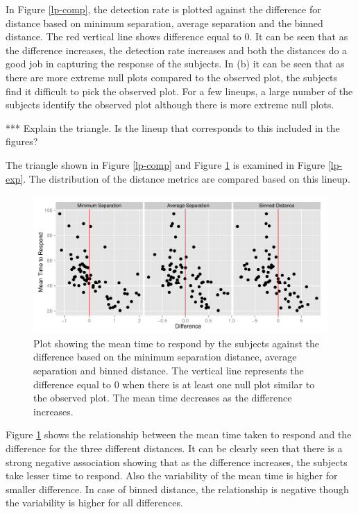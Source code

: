 \documentclass[12]{article}
\newcommand{\red}[1]{{\color{red} #1}}
\begin{document}
In Figure \ref{lp-comp}, the detection rate is plotted against the difference for distance based on minimum separation, average separation and the binned distance. The red vertical line shows difference equal to 0.  It can be seen that as the difference increases, the detection rate increases and both the distances do a good job in capturing the response of the subjects.  In (b) it can be seen that as there are more extreme null plots compared to the observed plot, the subjects find it difficult to pick the observed plot. For a few lineups, a large number of the subjects identify the observed plot although there is more extreme null plots. 

\red{*** Explain the triangle. Is the lineup that corresponds to this included in the figures?}

The triangle shown in Figure \ref{lp-comp} and Figure \ref{lp-mtime} is examined in Figure \ref{lp-exp}. The distribution of the distance metrics are compared based on this lineup. 

\begin{figure}[hbtp]
\centering
\includegraphics[scale=0.75]{largep-mtime-sep-bin.pdf}
	\vspace{-.1in}
\caption[Optional caption for list of figures]{Plot showing the mean time to respond by the subjects against the difference based on the minimum separation distance, average separation and binned distance. The vertical line represents the difference equal to 0 when there is at least one null plot similar to the observed plot. The mean time decreases as the difference increases.  }
\label{lp-mtime}
\end{figure}

Figure \ref{lp-mtime} shows the relationship between the mean time taken to respond and the difference for the three different distances. It can be clearly seen that there is a strong negative association showing that as the difference increases, the subjects take lesser time to respond. Also the variability of the mean time is higher for smaller difference. In case of binned distance, the relationship is negative though the variability is higher for all differences.
\end{document}
